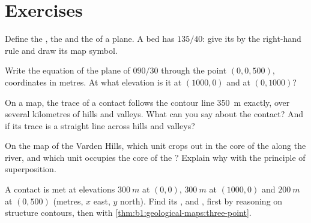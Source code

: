 \section{Exercises}

\begin{exercise}[$\star$]\label{exo:b1:geological-maps:1}
Define the , the  and the  of a plane. A bed has
 $135/40$: give its  by the right-hand rule and draw its map
symbol.
\end{exercise}

\begin{exercise}[$\star$]\label{exo:b1:geological-maps:2}
Write the equation of the plane of  $090/30$ through the point
$(0, 0, 500)$, coordinates in metres. At what elevation is it at
$(1000, 0)$ and at $(0, 1000)$?
\end{exercise}

\begin{exercise}[$\star$]\label{exo:b1:geological-maps:3}
On a map, the trace of a contact follows the contour line \qty{350}{m}
exactly, over several kilometres of hills and valleys. What can you say
about the contact? And if its trace is a straight line across hills and
valleys?
\end{exercise}

\begin{exercise}[$\star$]\label{exo:b1:geological-maps:4}
On the map of the Varden Hills, which unit crops out in the core of the
 along the river, and which unit occupies the core of the ?
Explain why with the principle of superposition.
\end{exercise}

\begin{exercise}[$\star\star$]\label{exo:b1:geological-maps:5}
A contact is met at elevations $\qty{300}{m}$ at $(0, 0)$, $\qty{300}{m}$ at
$(1000, 0)$ and $\qty{200}{m}$ at $(0, 500)$ (metres, $x$ east, $y$ north).
Find its ,  and , first by reasoning on structure
contours, then with \cref{thm:b1:geological-maps:three-point}.
\end{exercise}

